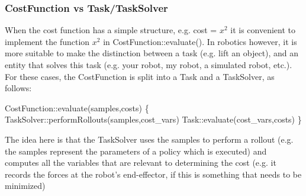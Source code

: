\hypertarget{page_bbo_sec_bbo_task_and_task_solver}{}\subsubsection{Cost\+Function vs Task/\+Task\+Solver}\label{page_bbo_sec_bbo_task_and_task_solver}
When the cost function has a simple structure, e.\+g. cost = $ x^2 $ it is convenient to implement the function $ x^2 $ in Cost\+Function\+::evaluate(). In robotics however, it is more suitable to make the distinction between a task (e.\+g. lift an object), and an entity that solves this task (e.\+g. your robot, my robot, a simulated robot, etc.). For these cases, the Cost\+Function is split into a Task and a Task\+Solver, as follows\+:


\begin{DoxyCode}
CostFunction::evaluate(samples,costs) \{
  TaskSolver::performRollouts(samples,cost\_vars)
  Task::evaluate(cost\_vars,costs)
\}
\end{DoxyCode}


The idea here is that the Task\+Solver uses the samples to perform a rollout (e.\+g. the samples represent the parameters of a policy which is executed) and computes all the variables that are relevant to determining the cost (e.\+g. it records the forces at the robot's end-\/effector, if this is something that needs to be minimized)

